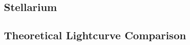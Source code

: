 \subsection{\label{sec:stellarium}Stellarium}

\subsection{\label{sec:theoreticalLightcurves}Theoretical Lightcurve Comparison}
